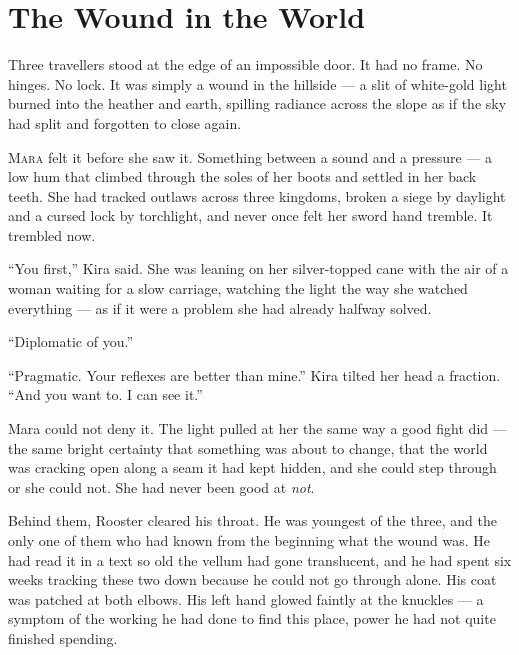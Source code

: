 \chapter*{The Wound in the World}


\begin{readaloud}
Three travellers stood at the edge of an impossible door.
It had no frame. No hinges. No lock. It was simply a wound
in the hillside --- a slit of white-gold light burned into
the heather and earth, spilling radiance across the slope
as if the sky had split and forgotten to close again.
\end{readaloud}

\lettrine{M}{ara} felt it before she saw it. Something between
a sound and a pressure --- a low hum that climbed through the
soles of her boots and settled in her back teeth. She had tracked
outlaws across three kingdoms, broken a siege by daylight and a
cursed lock by torchlight, and never once felt her sword hand
tremble. It trembled now.

``You first,'' Kira said. She was leaning on her silver-topped
cane with the air of a woman waiting for a slow carriage, watching
the light the way she watched everything --- as if it were a
problem she had already halfway solved.

``Diplomatic of you.''

``Pragmatic. Your reflexes are better than mine.'' Kira tilted her
head a fraction. ``And you want to. I can see it.''

Mara could not deny it. The light pulled at her the same way a
good fight did --- the same bright certainty that something was
about to change, that the world was cracking open along a seam it
had kept hidden, and she could step through or she could not. She
had never been good at \emph{not}.

Behind them, Rooster cleared his throat. He was youngest of the
three, and the only one of them who had known from the beginning
what the wound was. He had read it in a text so old the vellum had
gone translucent, and he had spent six weeks tracking these two
down because he could not go through alone. His coat was patched at
both elbows. His left hand glowed faintly at the knuckles --- a
symptom of the working he had done to find this place, power he
had not quite finished spending.

